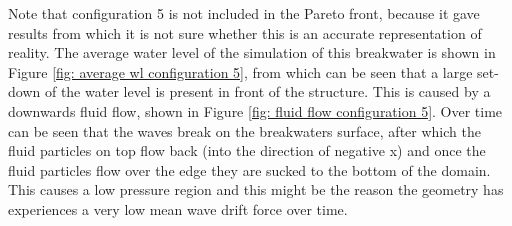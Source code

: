 Note that configuration 5 is not included in the Pareto front, because it gave results from which it is not sure whether this is an accurate representation of reality. The average water level of the simulation of this breakwater is shown in Figure \ref{fig: average wl configuration 5}, from which can be seen that a large set-down of the water level is present in front of the structure. This is caused by a downwards fluid flow, shown in Figure \ref{fig: fluid flow configuration 5}. Over time can be seen that the waves break on the breakwaters surface, after which the fluid particles on top flow back (into the direction of negative x) and once the fluid particles flow over the edge they are sucked to the bottom of the domain. This causes a low pressure region and this might be the reason the geometry has experiences a very low mean wave drift force over time. 

